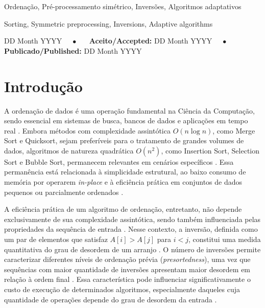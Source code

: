 \documentclass[portuguese]{sbc2025}%
\begin{document}
\begin{frontmatter}
\begin{pchaves}
Ordenação, Pré-processamento simétrico, Inversões, Algoritmos adaptativos
\end{pchaves}

\begin{keywords}
Sorting, Symmetric preprocessing, Inversions, Adaptive algorithms
\end{keywords}

\begin{dates}
 DD Month YYYY~~~$\bullet$~~~
{\sffamily\textbf{Aceito/Accepted:}} DD Month YYYY~~~$\bullet$~~~
{\sffamily\textbf{Publicado/Published:}} DD Month YYYY
\end{dates}

\end{frontmatter}

\section{Introdução}
\label{sec:intro}

A ordenação de dados é uma operação fundamental na Ciência da Computação, sendo essencial em sistemas de busca, bancos de dados e aplicações em tempo real \citep{knuth_art_1973, sedgewick_algorithms_2011}. Embora métodos com complexidade assintótica $O(n \log n)$, como Merge Sort e Quicksort, sejam preferíveis para o tratamento de grandes volumes de dados, algoritmos de natureza quadrática $O(n^2)$, como Insertion Sort, Selection Sort e Bubble Sort, permanecem relevantes em cenários específicos \citep{cormen_introduction_2022}. Essa permanência está relacionada à simplicidade estrutural, ao baixo consumo de memória por operarem \emph{in-place} e à eficiência prática em conjuntos de dados pequenos ou parcialmente ordenados \citep{cormen_introduction_2022,ziviani_projeto_2021}.

A eficiência prática de um algoritmo de ordenação, entretanto, não depende exclusivamente de sua complexidade assintótica, sendo também influenciada pelas propriedades da sequência de entrada \citep{estivill-castro_survey_1992}. Nesse contexto, a inversão, definida como um par de elementos que satisfaz $A[i] > A[j]$ para $i < j$, constitui uma medida quantitativa do grau de desordem de um arranjo \citep{knuth_art_1973, mannila_measures_1984}. O número de inversões permite caracterizar diferentes níveis de ordenação prévia (\emph{presortedness}), uma vez que sequências com maior quantidade de inversões apresentam maior desordem em relação à ordem final \citep{mannila_measures_1984}. Essa característica pode influenciar significativamente o custo de execução de determinados algoritmos, especialmente daqueles cuja quantidade de operações depende do grau de desordem da entrada \citep{estivill-castro_survey_1992}.
\end{document}
